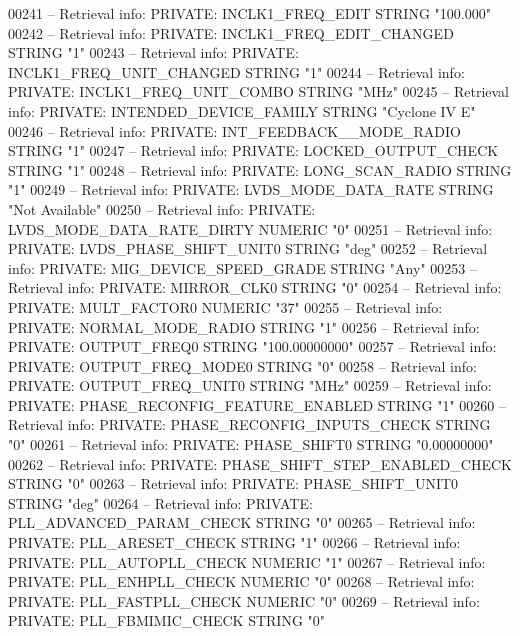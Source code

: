\begin{DoxyCode}
{00241 \textcolor{keyword}{-- Retrieval info: PRIVATE: INCLK1\_FREQ\_EDIT STRING "100.000"}
00242 \textcolor{keyword}{-- Retrieval info: PRIVATE: INCLK1\_FREQ\_EDIT\_CHANGED STRING "1"}
00243 \textcolor{keyword}{-- Retrieval info: PRIVATE: INCLK1\_FREQ\_UNIT\_CHANGED STRING "1"}
00244 \textcolor{keyword}{-- Retrieval info: PRIVATE: INCLK1\_FREQ\_UNIT\_COMBO STRING "MHz"}
00245 \textcolor{keyword}{-- Retrieval info: PRIVATE: INTENDED\_DEVICE\_FAMILY STRING "Cyclone IV E"}
00246 \textcolor{keyword}{-- Retrieval info: PRIVATE: INT\_FEEDBACK\_\_MODE\_RADIO STRING "1"}
00247 \textcolor{keyword}{-- Retrieval info: PRIVATE: LOCKED\_OUTPUT\_CHECK STRING "1"}
00248 \textcolor{keyword}{-- Retrieval info: PRIVATE: LONG\_SCAN\_RADIO STRING "1"}
00249 \textcolor{keyword}{-- Retrieval info: PRIVATE: LVDS\_MODE\_DATA\_RATE STRING "Not Available"}
00250 \textcolor{keyword}{-- Retrieval info: PRIVATE: LVDS\_MODE\_DATA\_RATE\_DIRTY NUMERIC "0"}
00251 \textcolor{keyword}{-- Retrieval info: PRIVATE: LVDS\_PHASE\_SHIFT\_UNIT0 STRING "deg"}
00252 \textcolor{keyword}{-- Retrieval info: PRIVATE: MIG\_DEVICE\_SPEED\_GRADE STRING "Any"}
00253 \textcolor{keyword}{-- Retrieval info: PRIVATE: MIRROR\_CLK0 STRING "0"}
00254 \textcolor{keyword}{-- Retrieval info: PRIVATE: MULT\_FACTOR0 NUMERIC "37"}
00255 \textcolor{keyword}{-- Retrieval info: PRIVATE: NORMAL\_MODE\_RADIO STRING "1"}
00256 \textcolor{keyword}{-- Retrieval info: PRIVATE: OUTPUT\_FREQ0 STRING "100.00000000"}
00257 \textcolor{keyword}{-- Retrieval info: PRIVATE: OUTPUT\_FREQ\_MODE0 STRING "0"}
00258 \textcolor{keyword}{-- Retrieval info: PRIVATE: OUTPUT\_FREQ\_UNIT0 STRING "MHz"}
00259 \textcolor{keyword}{-- Retrieval info: PRIVATE: PHASE\_RECONFIG\_FEATURE\_ENABLED STRING "1"}
00260 \textcolor{keyword}{-- Retrieval info: PRIVATE: PHASE\_RECONFIG\_INPUTS\_CHECK STRING "0"}
00261 \textcolor{keyword}{-- Retrieval info: PRIVATE: PHASE\_SHIFT0 STRING "0.00000000"}
00262 \textcolor{keyword}{-- Retrieval info: PRIVATE: PHASE\_SHIFT\_STEP\_ENABLED\_CHECK STRING "0"}
00263 \textcolor{keyword}{-- Retrieval info: PRIVATE: PHASE\_SHIFT\_UNIT0 STRING "deg"}
00264 \textcolor{keyword}{-- Retrieval info: PRIVATE: PLL\_ADVANCED\_PARAM\_CHECK STRING "0"}
00265 \textcolor{keyword}{-- Retrieval info: PRIVATE: PLL\_ARESET\_CHECK STRING "1"}
00266 \textcolor{keyword}{-- Retrieval info: PRIVATE: PLL\_AUTOPLL\_CHECK NUMERIC "1"}
00267 \textcolor{keyword}{-- Retrieval info: PRIVATE: PLL\_ENHPLL\_CHECK NUMERIC "0"}
00268 \textcolor{keyword}{-- Retrieval info: PRIVATE: PLL\_FASTPLL\_CHECK NUMERIC "0"}
00269 \textcolor{keyword}{-- Retrieval info: PRIVATE: PLL\_FBMIMIC\_CHECK STRING "0"}
}
\end{DoxyCode}
